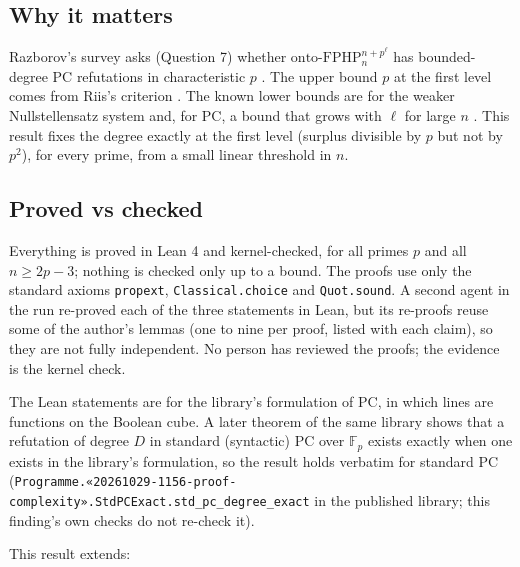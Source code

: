 \documentclass{article}
\begin{document}
\subsection*{Why it matters}

Razborov's survey asks (Question 7) whether $\mathrm{onto\text{-}FPHP}^{n+p^\ell}_n$ has
bounded-degree PC refutations in characteristic $p$ \cite{razborov2001php}. The upper bound $p$ at
the first level comes from Riis's criterion \cite{riis1993independence}. The known lower bounds are
for the weaker Nullstellensatz system \cite{beame1998counting} and, for PC, a bound that grows with
$\ell$ for large $n$ \cite{riis1997nonconstant}. This result fixes the degree exactly at the first
level (surplus divisible by $p$ but not by $p^2$), for every prime, from a small linear threshold
in $n$.

\subsection*{Proved vs checked}

Everything is proved in Lean 4 and kernel-checked, for all primes $p$ and all $n\ge2p-3$; nothing
is checked only up to a bound. The proofs use only the standard axioms \texttt{propext},
\texttt{Classical.choice} and \texttt{Quot.sound}. A second agent in the run re-proved each of the three statements in Lean, but
its re-proofs reuse some of the author's lemmas (one to nine per proof, listed with each claim), so
they are not fully independent. No person has reviewed the proofs; the evidence is the kernel check.

The Lean statements are for the library's formulation of PC, in which lines are functions on
the Boolean cube. A later theorem of the same library shows that a refutation of degree $D$ in
standard (syntactic) PC over $\mathbb F_p$ exists exactly when one exists in the library's
formulation, so the result holds verbatim for standard PC (\texttt{Programme.«20261029-1156-proof-complexity».StdPCExact.std\_pc\_degree\_exact} in the published library; this finding's own checks do not re-check it).

This result extends:
\end{document}
